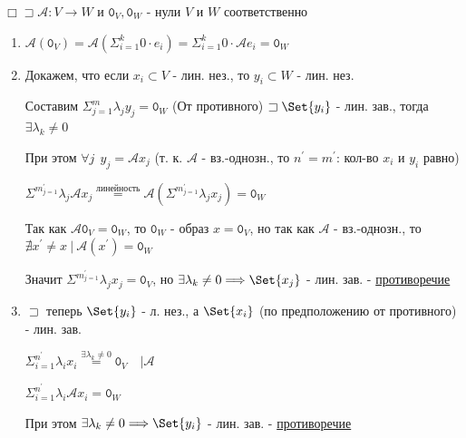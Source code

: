 \documentclass[12pt]{article}
\begin{document}
    $\Box \sqsupset \mathcal{A} : V \rightarrow W$ и $\displaystyle \texttt{0}_V, \texttt{0}_W$ - нули $V$ и $W$ соответственно
    \begin{enumerate}
        \item $\displaystyle \mathcal{A}(\texttt{0}_V) = \mathcal{A}(\Sigma^k_{i=1} 0 \cdot e_i) = \Sigma^k_{i=1} 0 \cdot \mathcal{A}e_i = \texttt{0}_W$

        \item Докажем, что если $\displaystyle {x_i} \subset V$ - лин. нез., то $\displaystyle {y_i} \subset W$ - лин. нез.

        Составим $\displaystyle \Sigma^m_{j=1} \lambda_j y_j = \texttt{0}_W$ (От противного) $\displaystyle \sqsupset \Set{y_i}$ - лин. зав., тогда $\displaystyle \exists \lambda_k \neq 0$

        При этом $\displaystyle \forall j \ \ y_j = \mathcal{A}x_j$ (т. к. $\mathcal{A}$ - вз.-однозн., то $\displaystyle n^\prime = m^\prime$: кол-во $\displaystyle x_i$ и $\displaystyle y_i$ равно)

        $\displaystyle \Sigma^m^\prime_{j=1} \lambda_j \mathcal{A}x_j \stackrel{\text{линейность}}{=} \mathcal{A} (\Sigma^m^\prime_{j=1} \lambda_j x_j) = \texttt{0}_W$

        Так как $\displaystyle \mathcal{A}\texttt{0}_V = \texttt{0}_W$, то $\displaystyle \texttt{0}_W$ - образ $\displaystyle x = \texttt{0}_V$, но так как $\mathcal{A}$ - вз.-однозн., то
        $\displaystyle \nexists x^\prime \neq x \ | \ \mathcal{A}(x^\prime) = \texttt{0}_W$

        Значит $\displaystyle \Sigma^m^\prime_{j=1} \lambda_j x_j = \texttt{0}_V$, но $\displaystyle \exists \lambda_k \neq 0 \Longrightarrow \Set{x_j}$ - лин. зав. - \underline{противоречие}

        \item $\sqsupset$ теперь $\displaystyle \Set{y_i}$ - л. нез., а $\displaystyle \Set{x_i}$ (по предположению от противного) - лин. зав.

        $\displaystyle \Sigma^{n^\prime}_{i = 1} \lambda_i x_i \stackrel{\exists \lambda_k \neq 0}{=} \texttt{0}_V \quad \Big| \mathcal{A}$

        $\displaystyle \Sigma^{n^\prime}_{i = 1} \lambda_i \mathcal{A}x_i = \texttt{0}_W$

        При этом $\displaystyle \exists \lambda_k \neq 0 \Longrightarrow \Set{y_i}$ - лин. зав. - \underline{противоречие}

    \end{enumerate}
\end{document}
